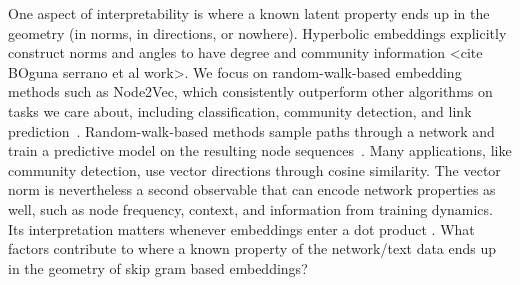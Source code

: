\documentclass[aps,pre,reprint,superscriptaddress,longbibliography]{revtex4-2}
\begin{document}
One aspect of interpretability is where a known latent property ends up in the geometry (in norms, in directions, or nowhere). Hyperbolic embeddings explicitly construct norms and angles to have degree and community information <cite BOguna serrano et al work>.
We focus on random-walk-based embedding methods such as Node2Vec, which consistently outperform other algorithms on tasks we care about, including classification, community detection, and link prediction~\cite{kojaku2024network, dehghan2022evaluating}.
Random-walk-based methods sample paths through a network and train a predictive model on the resulting node sequences~\cite{perozzi2014deepwalk,grover2016node2vec}.
Many applications, like community detection, use vector directions through cosine similarity. The vector norm is nevertheless a second observable that can encode network properties as well, such as node frequency, context, and information from training dynamics.
Its interpretation matters whenever embeddings enter a dot product \cite{steck2024cosine}.
What factors contribute to where a known property of the network/text data ends up in the geometry of skip gram based embeddings? 
\end{document}
